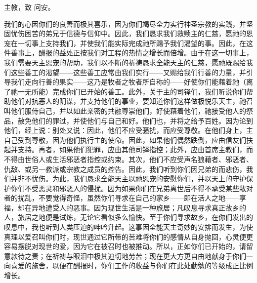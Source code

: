 \par

 主教，致  问安。\par

我们的心因你们的良善而极其喜乐，因为你们竭尽全力实行神圣宗教的实践，并坚固忧伤困苦的弟兄于信德与信仰中。因此，我们恳求我们救赎主的仁慈，愿祂的恩宠在一切事上支持我们，并使我们能实际完成祂所赐予我们渴望的事。因此，在这件善事上，酬报的益处正按我们对工程的热情之增长而倍增。由于在这一切事上，我们需要天主恩宠的帮助，我们以不断的祈祷恳求全能天主的仁慈，愿祂既赐给我们这些善工的渴望——这些善工应常由我们实行——又赐给我们行善的力量，并引导我们走向行善的果实——这乃是牧者之牧者所自称的——好使你们能藉着祂（离了祂一无所能）完成你们已开始的善工。此外，关于主的司铎们，我们听说你们帮助他们对抗恶人的阴谋，并支持他们的事业，要知道你们这样做极悦乐天主，祂召叫他们服侍自己，并以如此亲密的共融尊崇他们，好使藉着他们，祂接受他人的祭品，赦免他们的罪过，并使他们与自己和好。他们也，并将之给予百姓。因为论到他们，经上说：别处又说：因此，他们不应受骚扰，而应受尊敬。在他们身上，主自己受到尊敬，因为他们执行主的使命。因此，如果他们偶然跌倒，应由信友们扶起并支持。再者，如果他们犯罪，应由其他司铎指控；此外，应由首席主教们，而不得由世俗人或生活邪恶者指控或约束。其次，他们不应受声名狼藉者、邪恶者、仇敌、或另一教派或宗教之成员的控告。因此，我们听到你们因兄弟的而悲伤，我们并非不忧伤。为此，我们恳求全能天主以祂恩宠的安慰你们，并以天上的守护保护你们不受恶灵和邪恶人的侵扰。因为如果你们在兄弟离世后不得不承受某些敌对者的扰乱，不要觉得奇怪，虽然你们寻求在自己的家乡——即在活人之地——享福，却在异地遭受人的恶事。因为现世生活是一种旅居；凡叹息寻求真正故乡的人，旅居之地便是试炼，无论它看似多么愉快。至于你们寻求故乡，在你们发出的叹息中，我也听到人类压迫的呻吟升起。这事因全能天主奇妙的安排而发生，为使真理以爱召叫你们时，现世通过它所带的苦难将你们的感情从自身抛回，心灵便更容易摆脱对现世的爱，因为它在被召时也被推动。所以，正如你们已开始的，请留意款待之责；在祈祷与眼泪中极其迫切地劳苦；现在更大方更自由地献身于你们一向喜爱的施舍，以便在酬报时，你们工作的收益与你们在此处勤勉的等级成正比例增长。\par

